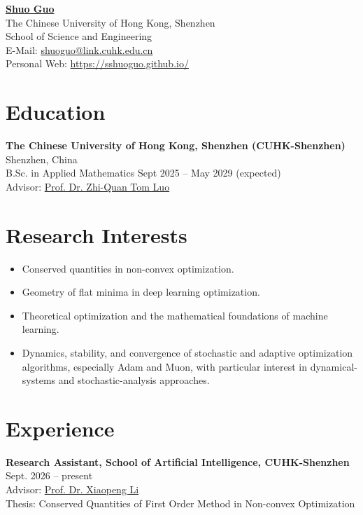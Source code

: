 \documentclass[11pt]{article}
\begin{document}
\begin{center}
    {\LARGE \href{https://www.sshuoguo.github.io}{\textbf{Shuo Guo}}}\\[3pt]
    The Chinese University of Hong Kong, Shenzhen\\
    School of Science and Engineering\\
    E-Mail: \href{mailto:shuoguo@link.cuhk.edu.cn}{shuoguo@link.cuhk.edu.cn}\\
    Personal Web: \href{https://sshuoguo.github.io/}{https://sshuoguo.github.io/}
\end{center}

\section*{Education}

\textbf{The Chinese University of Hong Kong, Shenzhen (CUHK-Shenzhen)} \hfill Shenzhen, China\\
B.Sc. in Applied Mathematics \hfill Sept 2025 -- May 2029 (expected)\\
Advisor: \href{https://tomluo123.github.io/}{Prof. Dr. Zhi-Quan Tom Luo}

\section*{Research Interests}

\begin{itemize}
    \item Conserved quantities in non-convex optimization.
    \item Geometry of flat minima in deep learning optimization.
    \item Theoretical optimization and the mathematical foundations of machine learning.
    \item Dynamics, stability, and convergence of stochastic and adaptive optimization algorithms, especially Adam and Muon, with particular interest in dynamical-systems and stochastic-analysis approaches.
\end{itemize}

\section*{Experience}

\textbf{Research Assistant, School of Artificial Intelligence, CUHK-Shenzhen} \hfill Sept. 2026 -- present\\
Advisor: \href{https://williampixell.github.io/}{Prof. Dr. Xiaopeng Li}\\
Thesis: Conserved Quantities of First Order Method in Non-convex Optimization
\end{document}
